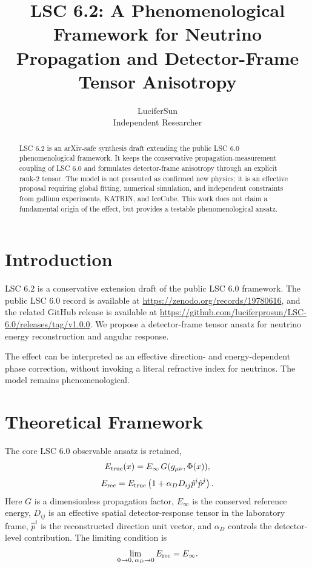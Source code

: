 \documentclass[11pt]{article}
\title{LSC 6.2: A Phenomenological Framework for Neutrino Propagation and Detector-Frame Tensor Anisotropy}
\author{LuciferSun \\ Independent Researcher}
\date{}
\begin{document}
\maketitle
\begin{abstract}
LSC 6.2 is an arXiv-safe synthesis draft extending the public LSC 6.0 phenomenological framework. It keeps the conservative propagation-measurement coupling of LSC 6.0 and formulates detector-frame anisotropy through an explicit rank-2 tensor. The model is not presented as confirmed new physics; it is an effective proposal requiring global fitting, numerical simulation, and independent constraints from gallium experiments, KATRIN, and IceCube.
This work does not claim a fundamental origin of the effect, but provides a testable phenomenological ansatz.
\end{abstract}

\section{Introduction}
LSC 6.2 is a conservative extension draft of the public LSC 6.0 framework. The public LSC 6.0 record is available at \url{https://zenodo.org/records/19780616}, and the related GitHub release is available at \url{https://github.com/luciferprosun/LSC-6.0/releases/tag/v1.0.0}. We propose a detector-frame tensor ansatz for neutrino energy reconstruction and angular response.

The effect can be interpreted as an effective direction- and energy-dependent phase correction, without invoking a literal refractive index for neutrinos. The model remains phenomenological.

\section{Theoretical Framework}
The core LSC 6.0 observable ansatz is retained,
\begin{equation}
 E_{\rm true}(x)=E_\infty\,G(g_{\mu\nu},\Phi(x)),
\end{equation}
\begin{equation}
 E_{\rm rec}=E_{\rm true}\left(1+\alpha_D D_{ij}\hat p^i\hat p^j\right).
\end{equation}
Here $G$ is a dimensionless propagation factor, $E_\infty$ is the conserved reference energy, $D_{ij}$ is an effective spatial detector-response tensor in the laboratory frame, $\hat p^i$ is the reconstructed direction unit vector, and $\alpha_D$ controls the detector-level contribution. The limiting condition is
\begin{equation}
 \lim_{\Phi\to 0,\,\alpha_D\to 0}E_{\rm rec}=E_\infty.
\end{equation}
\end{document}
